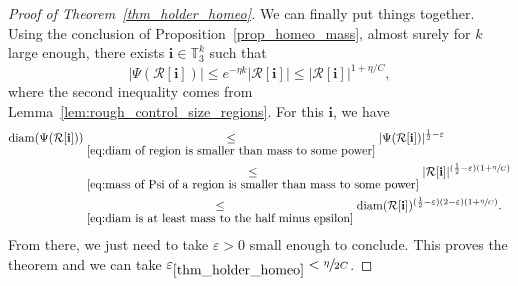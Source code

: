 \documentclass[11pt]{article}
\newcommand{\Rr}{\mathcal{R}}
\newcommand{\ii}{\mathbf{i}}
\newcommand{\diam}{\mathrm{diam}}
\let\eps\varepsilon
\theoremstyle{plain}
\theoremstyle{definition}
\numberwithin{equation}{section}
\begin{document}
\begin{proof}[Proof of Theorem~\ref{thm_holder_homeo}]
We can finally put things together.
Using the conclusion of Proposition~\ref{prop_homeo_mass}, almost surely for $k$ large enough, there exists $\ii \in \mathbb{T}_3^k$ such that\vspace*{-3pt}
\begin{equation}
\label{eq:mass of Psi of a region is smaller than mass to some power}
\left| \Psi \left( \Rr[\ii] \right) \right| \leq e^{-\eta k} \left| \Rr[\ii] \right| \leq \left| \Rr[\ii] \right|^{1+\eta/C},
\end{equation}
where the second inequality comes from Lemma~\ref{lem:rough_control_size_regions}.
For this $\ii$, we have\vspace*{-3pt}
\begin{align*}
\diam(\Psi(\Rr[\ii ])) &\underset{\eqref{eq:diam of region is smaller than mass to some power}}{\leq} |\Psi(\Rr[\ii ])|^{\frac{1}{2}-\eps}\\
&\underset{\eqref{eq:mass of Psi of a region is smaller than mass to some power}}{\leq} |\Rr[\ii ]|^{(\frac{1}{2}-\eps)(1+\sfrac{\eta}{C})}\\
&\underset{\eqref{eq:diam is at least mass to the half minus epsilon}}{\leq} \diam(\Rr[\ii ])^{(\frac{1}{2}-\eps)(2-\eps)(1+\sfrac{\eta}{C})}.
\end{align*}
From there, we just need to take $\eps>0$ small enough to conclude. This proves the theorem and we can take $\eps_{\ref{thm_holder_homeo}}<\sfrac{\eta}{2C}$.
\end{proof}
\end{document}
